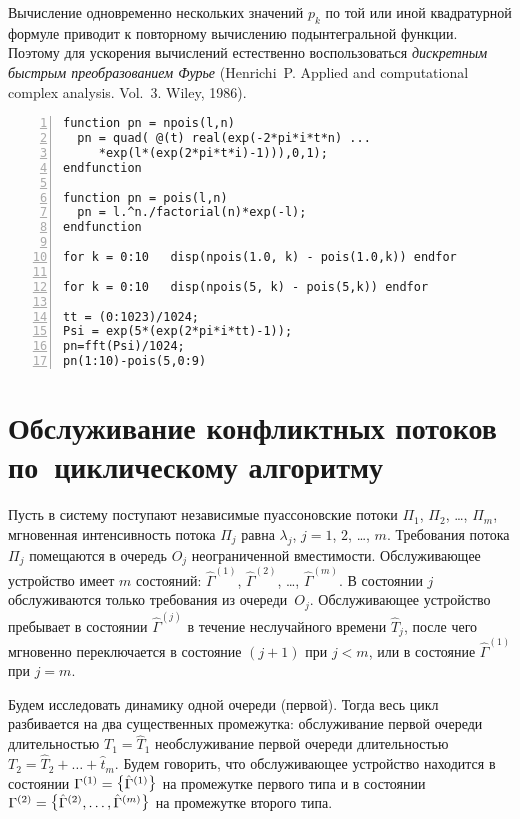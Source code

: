 \documentclass[10pt,oneside,final]{book}
\begin{document}
Вычисление одновременно нескольких значений $p_k$ по той или иной квадратурной
формуле приводит к повторному вычислению подынтегральной функции. Поэтому для
ускорения вычислений естественно воспользоваться \emph{дискретным быстрым
  преобразованием Фурье} (Henrichi~P. Applied and computational complex
analysis. Vol.~3. Wiley, 1986).

\begin{Verbatim}[frame=single,xleftmargin=2em,numbers=left]
function pn = npois(l,n)
  pn = quad( @(t) real(exp(-2*pi*i*t*n) ...
     *exp(l*(exp(2*pi*t*i)-1))),0,1);
endfunction

function pn = pois(l,n)
  pn = l.^n./factorial(n)*exp(-l);
endfunction

for k = 0:10   disp(npois(1.0, k) - pois(1.0,k)) endfor

for k = 0:10   disp(npois(5, k) - pois(5,k)) endfor

tt = (0:1023)/1024;
Psi = exp(5*(exp(2*pi*i*tt)-1));
pn=fft(Psi)/1024;
pn(1:10)-pois(5,0:9)
\end{Verbatim}


\section{Обслуживание конфликтных потоков по~циклическому алгоритму}

Пусть в систему поступают независимые пуассоновские потоки $\Pi_1$, $\Pi_2$,
\ldots, $\Pi_m$, мгновенная интенсивность потока $\Pi_j$ равна $\lambda_j$,
$j=1$, $2$, \ldots, $m$. Требования потока $\Pi_j$ помещаются в очередь $O_j$
неограниченной вместимости. Обслуживающее устройство имеет $m$ состояний: $\hat
\Gamma^{(1)}$, $\hat \Gamma^{(2)}$, \ldots, $\hat \Gamma^{(m)}$. В состоянии $j$
обслуживаются только требования из очереди~$O_j$. Обслуживающее устройство
пребывает в состоянии $\hat \Gamma^{(j)}$ в течение неслучайного времени $\hat T_j$, после
чего мгновенно переключается в состояние $(j+1)$ при $j<m$, или в состояние
$\hat \Gamma^{(1)}$ при $j=m$. 


Будем исследовать динамику одной очереди (первой). Тогда весь цикл разбивается
на два существенных промежутка: обслуживание первой очереди длительностью
$T_1=\hat T_1$ необслуживание первой очереди длительностью $T_2=\hat
T_2+\ldots+\hat t_m$. Будем говорить, что обслуживающее устройство находится в
состоянии $\Gamma^{(1)}=\raisebox{1pt}{$\mathsurround=0pt \bigl\{$}\hat
\Gamma^{(1)}\raisebox{1pt}{$\mathsurround=0pt \bigr\}$}$ на промежутке первого
типа и в состоянии $\Gamma^{(2)}=\raisebox{1pt}{$\mathsurround=0pt \bigl\{$}\hat
\Gamma^{(2)}, \ldots, \hat\Gamma^{(m)}\raisebox{1pt}{$\mathsurround=0pt
  \bigr\}$}$ на промежутке второго типа.
\end{document}
